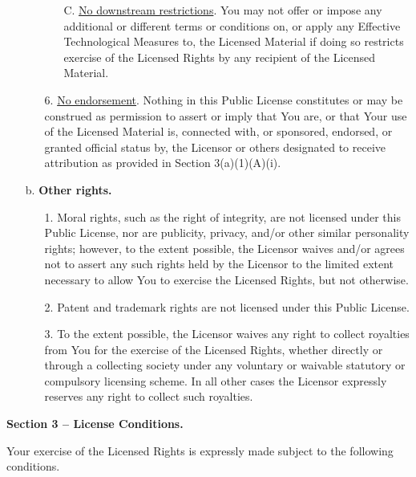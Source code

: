 \begin{itemize}
\begin{itemize}
\begin{itshape}
\begin{itemize}
            \item[C.] \underline{No downstream restrictions}. You may not offer or impose any additional or different terms or conditions on, or apply any Effective Technological Measures to, the Licensed Material if doing so restricts exercise of the Licensed Rights by any recipient of the Licensed Material.
        \end{itemize}\end{itshape}
        \item[6.] \underline{No endorsement}. Nothing in this Public License constitutes or may be construed as permission to assert or imply that You are, or that Your use of the Licensed Material is, connected with, or sponsored, endorsed, or granted official status by, the Licensor or others designated to receive attribution as provided in Section 3(a)(1)(A)(i).
    \end{itemize}
    \item[b.] \textbf{Other rights.}
    \begin{itemize}
        \item[1.] Moral rights, such as the right of integrity, are not licensed under this Public License, nor are publicity,
          privacy, and/or other similar personality rights; however, to the extent possible, the Licensor waives and/or agrees not to assert any such rights held by the Licensor to the limited extent necessary to allow You to exercise the Licensed Rights, but not otherwise.
        \item[2.] Patent and trademark rights are not licensed under this Public License.
        \item[3.] To the extent possible, the Licensor waives any right to collect royalties from You for the exercise of the Licensed Rights, whether directly or through a collecting society under any voluntary or waivable statutory or compulsory licensing scheme. In all other cases the Licensor expressly reserves any right to collect such royalties.
    \end{itemize}
\end{itemize}

\begin{center}
    \textbf{Section 3 -- License Conditions.}
\end{center}

Your exercise of the Licensed Rights is expressly made subject to the following conditions.

